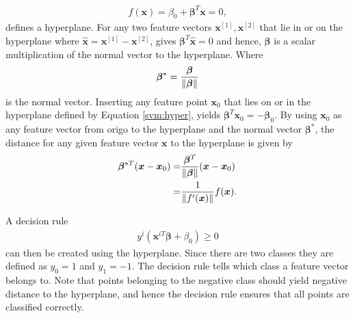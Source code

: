             \begin{align}
                f(\bm x) = \beta_0 + \bm \beta^T\bm x = 0,
                \label{svm:hyper}
            \end{align}
            defines a hyperplane. For any two feature vectors $\bm x^{[1]},\bm x^{[2]}$ that lie in or on the hyperplane where $\bm \hat x = \bm x^{[1]} - \bm x^{[2]}$, gives  $\bm \beta^T \bm \hat x = 0 $ and hence, $\bm \beta$ is a scalar multiplication of the normal vector to the hyperplane. Where
            \begin{align}
                \bm \beta^* = \frac{\bm \beta}{\lVert\bm \beta\rVert}
                \label{svm:norm}
            \end{align}
            is the normal vector. Inserting any feature point $\bm x_0$ that lies on or in the hyperplane defined by Equation \ref{svm:hyper}, yields $\bm \beta^T\bm x_0 = -\bm \beta_0$. By using $\bm x_0$ as any feature vector from origo to the hyperplane and the normal vector $\bm \beta^*$, the distance for any given feature vector $\bm x$ to the hyperplane is given by
            \begin{align}
                \bm \beta^{*T}(\bm x - \bm x_0) = & \frac{\bm \beta^T}{\lVert\bm \beta\rVert} (\bm x - \bm x_0) \nonumber \\
                = & \frac{1}{\lVert f'(\bm x)\rVert}f(\bm x).
                \label{svm:dist}
            \end{align}
            
            A decision rule 
            \begin{align}
                y^i(\bm x^{iT} \bm \beta + \beta_0) \geq 0 
                \label{svm:decision}
            \end{align}
            can then be created using the hyperplane. Since there are two classes they are defined as $y_0 = 1$ and $y_1 = -1$. The decision rule tells which class a feature vector belongs to. Note that points belonging to the negative class should yield negative distance to the hyperplane, and hence the decision rule ensures that all points are classified correctly.
            
